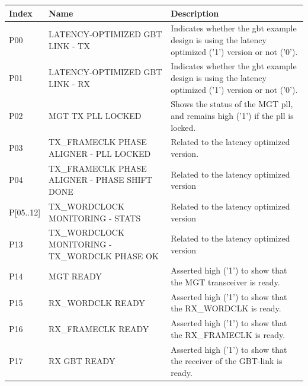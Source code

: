 \documentclass[main.tex]{subfiles}
\begin{document}
\begin{table}[H]
\small
\begin{center}
  \begin{tabular}{| l | p{5cm} | p{8cm} |}
  \hline
    Index & Name & Description   \\
    \hline
  P00     & LATENCY-OPTIMIZED GBT LINK - TX   & Indicates whether the \gls{gbt} example design is using the latency optimized ('1') version or not ('0').    \\
  \hline
  P01     & LATENCY-OPTIMIZED GBT LINK - RX   & Indicates whether the \gls{gbt} example design is using the latency optimized ('1') version or not ('0').      \\
  \hline
  P02       & MGT TX PLL LOCKED               & Shows the status of the MGT pll, and remains high ('1') if the pll is locked.  \\    
  \hline
  P03     & TX\_FRAMECLK PHASE ALIGNER - PLL LOCKED     & Related to the latency optimized version. \\     
  \hline
  P04       & TX\_FRAMECLK PHASE ALIGNER - PHASE SHIFT DONE   & Related to the latency optimized version \\    
  \hline
  P[05..12]   & TX\_WORDCLOCK MONITORING - STATS        & Related to the latency optimized version \\    
  \hline
  P13     & TX\_WORDCLOCK MONITORING - TX\_WORDCLK PHASE OK & Related to the latency optimized version \\    
  \hline
  P14       & MGT READY             & Asserted high ('1') to show that the MGT transceiver is ready. \\
  \hline
  P15       & RX\_WORDCLK READY         & Asserted high ('1') to show that the RX\_WORDCLK is ready. \\
  \hline
  P16       & RX\_FRAMECLK READY        & Asserted high ('1') to show that the RX\_FRAMECLK is ready. \\
  \hline
  P17       & RX GBT READY            & Asserted high ('1') to show that the receiver of the GBT-link is ready. \\

\end{tabular}
\end{center}
\end{table}
\end{document}
